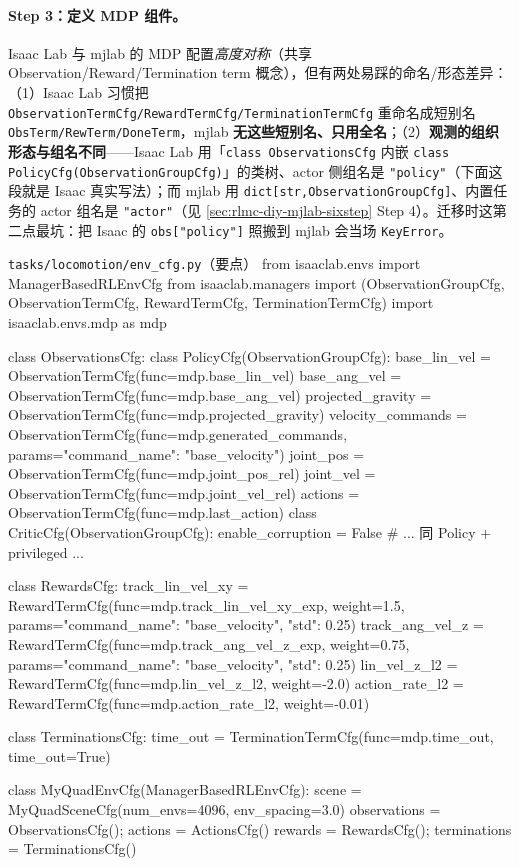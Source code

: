 \paragraph{Step 3：定义 MDP 组件。}Isaac Lab 与 mjlab 的 MDP 配置\emph{高度对称}（共享 Observation/Reward/Termination term 概念），但有两处易踩的命名/形态差异：（1）Isaac Lab 习惯把 \verb|ObservationTermCfg/RewardTermCfg/TerminationTermCfg| 重命名成短别名 \verb|ObsTerm/RewTerm/DoneTerm|，mjlab \textbf{无这些短别名、只用全名}；（2）\textbf{观测的组织形态与组名不同}——Isaac Lab 用「\verb|class ObservationsCfg| 内嵌 \verb|class PolicyCfg(ObservationGroupCfg)|」的类树、actor 侧组名是 \verb|"policy"|（下面这段就是 Isaac 真实写法）；而 mjlab 用 \verb|dict[str,ObservationGroupCfg]|、内置任务的 actor 组名是 \verb|"actor"|（见 \cref{sec:rlmc-diy-mjlab-sixstep} Step 4）。迁移时这第二点最坑：把 Isaac 的 \verb|obs["policy"]| 照搬到 mjlab 会当场 \verb|KeyError|。

\begin{codebox}[Python]{\texttt{tasks/locomotion/env\_cfg.py}（要点）}
from isaaclab.envs import ManagerBasedRLEnvCfg
from isaaclab.managers import (ObservationGroupCfg, ObservationTermCfg,
                               RewardTermCfg, TerminationTermCfg)
import isaaclab.envs.mdp as mdp

class ObservationsCfg:
    class PolicyCfg(ObservationGroupCfg):
        base_lin_vel      = ObservationTermCfg(func=mdp.base_lin_vel)
        base_ang_vel      = ObservationTermCfg(func=mdp.base_ang_vel)
        projected_gravity = ObservationTermCfg(func=mdp.projected_gravity)
        velocity_commands = ObservationTermCfg(func=mdp.generated_commands,
                                params={"command_name": "base_velocity"})
        joint_pos = ObservationTermCfg(func=mdp.joint_pos_rel)
        joint_vel = ObservationTermCfg(func=mdp.joint_vel_rel)
        actions   = ObservationTermCfg(func=mdp.last_action)
    class CriticCfg(ObservationGroupCfg):
        enable_corruption = False
        # ... 同 Policy + privileged ...

class RewardsCfg:
    track_lin_vel_xy = RewardTermCfg(func=mdp.track_lin_vel_xy_exp, weight=1.5,
                        params={"command_name": "base_velocity", "std": 0.25})
    track_ang_vel_z  = RewardTermCfg(func=mdp.track_ang_vel_z_exp, weight=0.75,
                        params={"command_name": "base_velocity", "std": 0.25})
    lin_vel_z_l2     = RewardTermCfg(func=mdp.lin_vel_z_l2,   weight=-2.0)
    action_rate_l2   = RewardTermCfg(func=mdp.action_rate_l2, weight=-0.01)

class TerminationsCfg:
    time_out = TerminationTermCfg(func=mdp.time_out, time_out=True)

class MyQuadEnvCfg(ManagerBasedRLEnvCfg):
    scene = MyQuadSceneCfg(num_envs=4096, env_spacing=3.0)
    observations = ObservationsCfg(); actions = ActionsCfg()
    rewards = RewardsCfg(); terminations = TerminationsCfg()
\end{codebox}

